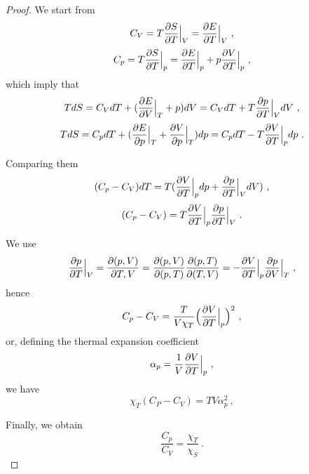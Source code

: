     \begin{proof}
        We start from
        \begin{equation*}
            C_V = T \frac{\partial S}{\partial T} \Big \vert_V = \frac{\partial E}{\partial T} \Big \vert_V ~,
        \end{equation*}
        \begin{equation*}
            C_p = T \frac{\partial S}{\partial T} \Big \vert_p = \frac{\partial E}{\partial T} \Big \vert_p + p \frac{\partial V}{\partial T} \Big \vert_p  ~,
        \end{equation*}
        which imply that 
        \begin{equation*}
            T dS = C_V dT + ( \frac{\partial E}{\partial V} \Big \vert_{T} + p) dV = C_V dT + T \frac{\partial p}{\partial T} \Big \vert_V dV ~,
        \end{equation*}
        \begin{equation*}
            T dS = C_p dT + ( \frac{\partial E}{\partial p} \Big \vert_T + \frac{\partial V}{\partial p} \Big \vert_T ) dp = C_p dT - T \frac{\partial V}{\partial T} \Big \vert_p dp ~.
        \end{equation*}

        Comparing them 
        \begin{equation*}
            (C_p - C_V) dT = T (\frac{\partial V}{\partial T} \Big \vert_p dp + \frac{\partial p}{\partial T} \Big \vert_V dV) ~,
        \end{equation*}
        \begin{equation*}
            (C_p - C_V) = T \frac{\partial V}{\partial T} \Big \vert_p \frac{\partial p}{\partial T} \Big \vert_V ~.
        \end{equation*}

        We use 
        \begin{equation*}
            \frac{\partial p}{\partial T} \Big \vert_V = \frac{\partial(p, V)}{\partial T, V} = \frac{\partial(p,V)}{\partial(p, T)} \frac{\partial(p, T)}{\partial(T, V)} = - \frac{\partial V}{\partial T} \Big \vert_p \frac{\partial p}{\partial V} \Big \vert_T ~,
        \end{equation*}
        hence 
        \begin{equation*}
            C_p - C_V = \frac{T}{V \chi_T} \Big ( \frac{\partial V}{\partial T} \Big \vert_p \Big)^2 ~,
        \end{equation*}
        or, defining the thermal expansion coefficient
        \begin{equation}
            \alpha_p = \frac{1}{V} \frac{\partial V}{\partial T} \Big \vert_p~,
        \end{equation}
        we have 
        \begin{equation*}
            \chi_T (C_P - C_V) = T V \alpha_p^2 ~,
        \end{equation*}

        Finally, we obtain 
        \begin{equation*}
            \frac{C_p}{C_V} = \frac{\chi_T}{\chi_S} ~.
        \end{equation*}
    \end{proof}
    
